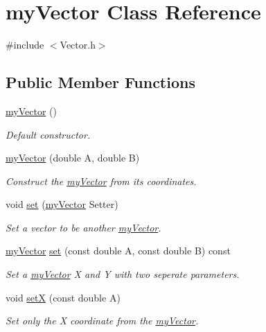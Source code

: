 \hypertarget{classmy_vector}{}\section{my\+Vector Class Reference}
\label{classmy_vector}


{\ttfamily \#include $<$Vector.\+h$>$}

\subsection*{Public Member Functions}
\begin{DoxyCompactItemize}
\item 
\hyperlink{classmy_vector_ae1bc15cce3be9c327b52f02da1c24503}{my\+Vector} ()
\begin{DoxyCompactList}\small\item\em Default constructor. \end{DoxyCompactList}\item 
\hyperlink{classmy_vector_a3c242231d09872ff18adcff8c5199dbd}{my\+Vector} (double A, double B)
\begin{DoxyCompactList}\small\item\em Construct the \hyperlink{classmy_vector}{my\+Vector} from its coordinates. \end{DoxyCompactList}\item 
void \hyperlink{classmy_vector_a14e8c2e0a550947a93cf178d50525a30}{set} (\hyperlink{classmy_vector}{my\+Vector} Setter)
\begin{DoxyCompactList}\small\item\em Set a vector to be another \hyperlink{classmy_vector}{my\+Vector}. \end{DoxyCompactList}\item 
\hyperlink{classmy_vector}{my\+Vector} \hyperlink{classmy_vector_a15d24fec4efc0a50a2648a7a54e79b4f}{set} (const double A, const double B) const 
\begin{DoxyCompactList}\small\item\em Set a \hyperlink{classmy_vector}{my\+Vector} X and Y with two seperate parameters. \end{DoxyCompactList}\item 
void \hyperlink{classmy_vector_af5d310b4175917d94960f8d8a915583d}{set\+X} (const double A)
\begin{DoxyCompactList}\small\item\em Set only the X coordinate from the \hyperlink{classmy_vector}{my\+Vector}. \end{DoxyCompactList}\item 

\end{DoxyCompactItemize}

